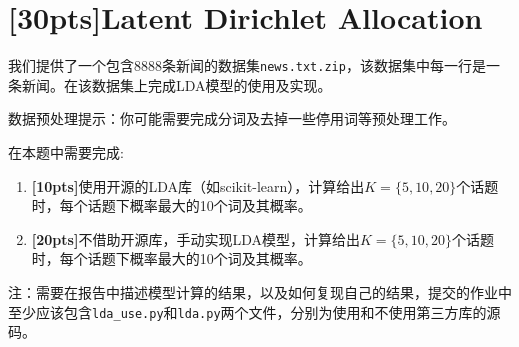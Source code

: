 \documentclass[a4paper,UTF8]{article}
\numberwithin{equation}{section}
\begin{document}
\section{\textbf{[30pts]}Latent Dirichlet Allocation}
我们提供了一个包含$8888$条新闻的数据集\texttt{news.txt.zip}，该数据集中每一行是一条新闻。在该数据集上完成LDA模型的使用及实现。

数据预处理提示：你可能需要完成分词及去掉一些停用词等预处理工作。

在本题中需要完成:
\begin{enumerate}
    \item \textbf{[10pts]}使用开源的LDA库（如scikit-learn），计算给出$K=\{5, 10, 20\}$个话题时，每个话题下概率最大的10个词及其概率。
    \item \textbf{[20pts]}不借助开源库，手动实现LDA模型，计算给出$K=\{5, 10, 20\}$个话题时，每个话题下概率最大的10个词及其概率。
\end{enumerate}
注：需要在报告中描述模型计算的结果，以及如何复现自己的结果，提交的作业中至少应该包含\texttt{lda\_use.py}和\texttt{lda.py}两个文件，分别为使用和不使用第三方库的源码。
\end{document}
